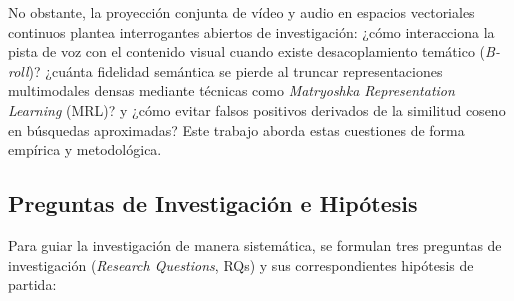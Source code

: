No obstante, la proyección conjunta de vídeo y audio en espacios vectoriales continuos plantea interrogantes abiertos de investigación: ¿cómo interacciona la pista de voz con el contenido visual cuando existe desacoplamiento temático (\textit{B-roll})? ¿cuánta fidelidad semántica se pierde al truncar representaciones multimodales densas mediante técnicas como \textit{Matryoshka Representation Learning} (MRL)? y ¿cómo evitar falsos positivos derivados de la similitud coseno en búsquedas aproximadas? Este trabajo aborda estas cuestiones de forma empírica y metodológica.

\subsection{Preguntas de Investigación e Hipótesis}
\label{subsec:rqs_hipotesis}

Para guiar la investigación de manera sistemática, se formulan tres preguntas de investigación (\textit{Research Questions}, RQs) y sus correspondientes hipótesis de partida:


